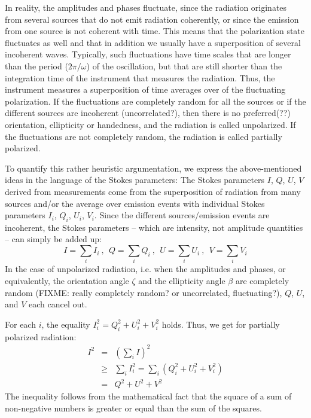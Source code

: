 In reality, the amplitudes and phases fluctuate, since the radiation
originates from several sources that do not emit radiation coherently,
or since the emission from one source is not coherent with time. This
means that the polarization state fluctuates as well and that in
addition we usually have a superposition of several incoherent waves.
Typically, such fluctuations have time scales that are longer than the
period ($2\pi/\omega$) of the oscillation, but that are still shorter
than the integration time of the instrument that measures the
radiation. Thus, the instrument measures a superposition of time averages
over of the fluctuating polarization. If the fluctuations are
completely random for all the sources or if the different sources are
incoherent (uncorrelated?), then there is no preferred(??)
orientation, ellipticity or handedness, and the radiation is called
unpolarized. If the fluctuations are not completely random, the
radiation is called partially polarized.

To quantify this rather heuristic argumentation, we express the
above-mentioned ideas in the language of the Stokes parameters:
The Stokes parameters $I$, $Q$, $U$, $V$
derived from measurements come from the superposition of
radiation from many sources and/or the average over emission events with individual Stokes
parameters $I_i$, $Q_i$, $U_i$, $V_i$.  Since the different
sources/emission events are incoherent, the Stokes parameters -- which
are intensity, not amplitude quantities -- can
simply be added up:
\begin{equation}
  \label{eq:polarization:summed_stokes}
  I = \sum_i I_i \: \mbox{, }\; 
  Q = \sum_i Q_i \: \mbox{, }\; 
  U = \sum_i U_i \: \mbox{, }\; 
  V = \sum_i V_i
\end{equation}
In the case of unpolarized radiation, i.e. when the amplitudes and
phases, or equivalently, the orientation angle $\zeta$ and the
ellipticity angle $\beta$ are completely random (FIXME: really
completely random? or uncorrelated, fluctuating?), $Q$, $U$, and $V$
each cancel out.

For each $i$, the equality $I_i^2 = Q_i^2 + U_i^2 + V_i^2$
holds. Thus, we get for partially polarized radiation:
\begin{eqnarray}
  I^2 &=& \left(\sum_i I\right)^2\\ \nonumber
      &\geq& \sum_i I_i^2 = \sum_i (Q_i^2  + U_i^2 + V_i^2)\\ \nonumber
      &=& Q^2 + U^2 + V^2
  \label{eq:polarization:stokes_inequality}
\end{eqnarray}
The inequality follows from  the mathematical fact that the square of
a sum of non-negative numbers is greater or equal than the sum of the
squares. 

